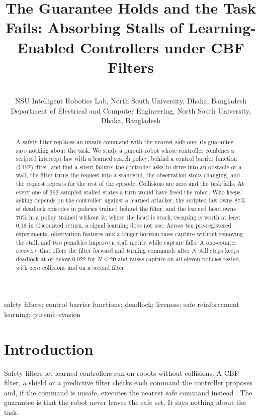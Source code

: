 \documentclass{l4dc2027}
\title[Safe and Stuck]{The Guarantee Holds and the Task Fails: Absorbing Stalls of Learning-Enabled Controllers under CBF Filters}
\author{%
 \Name{Mohammad Shoaib} \Email{[to confirm]}\\
 \addr NSU Intelligent Robotics Lab, North South University, Dhaka, Bangladesh
 \AND
 \Name{Shahnewaz Siddique} \Email{shahnewaz.siddique@northsouth.edu}\\
 \addr Department of Electrical and Computer Engineering, North South University, Dhaka, Bangladesh%
}
\begin{document}
\maketitle

\begin{abstract}%
A safety filter replaces an unsafe command with the nearest safe one; its guarantee says nothing about the task. We study a pursuit robot whose controller combines a scripted intercept law with a learned search policy, behind a control barrier function (CBF) filter, and find a silent failure: the controller asks to drive into an obstacle or a wall, the filter turns the request into a standstill, the observation stops changing, and the request repeats for the rest of the episode. Collisions are zero and the task fails. At every one of 262 sampled stalled states a turn would have freed the robot. Who keeps asking depends on the controller: against a learned attacker, the scripted law owns 87\% of deadlock episodes in policies trained behind the filter, and the learned head owns 76\% in a policy trained without it; where the head is stuck, escaping is worth at least 0.18 in discounted return, a signal learning does not use. Across ten pre-registered experiments, observation features and a longer horizon raise capture without removing the stall, and two penalties improve a stall metric while capture falls. A one-counter recovery that offers the filter forward and turning commands after $N$ still steps keeps deadlock at or below 0.022 for $N \le 20$ and raises capture on all eleven policies tested, with zero collisions and on a second filter.%
\end{abstract}

\begin{keywords}%
safety filters; control barrier functions; deadlock; liveness; safe reinforcement learning; pursuit--evasion%
\end{keywords}

\section{Introduction}\label{sec:intro}

Safety filters let learned controllers run on robots without collisions. A CBF filter, a shield or a predictive filter checks each command the controller proposes and, if the command is unsafe, executes the nearest safe command instead \citep{hsu2024safetyfilter,ames2019cbf,alshiekh2018shielding,cheng2019endtoend}. The guarantee is that the robot never leaves the safe set. It says nothing about the task.
\end{document}
